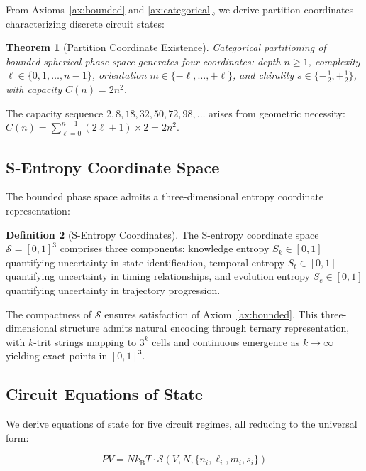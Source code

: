 \documentclass[12pt,a4paper]{article}
\theoremstyle{plain}
\newtheorem{theorem}{Theorem}[section]
\theoremstyle{definition}
\newtheorem{definition}[theorem]{Definition}
\theoremstyle{remark}
\newcommand{\kB}{k_{\mathrm{B}}}
\newcommand{\Sspace}{\mathcal{S}}
\newcommand{\Sk}{S_k}
\newcommand{\St}{S_t}
\newcommand{\Se}{S_e}
\begin{document}
From Axioms~\ref{ax:bounded} and \ref{ax:categorical}, we derive partition coordinates characterizing discrete circuit states:

\begin{theorem}[Partition Coordinate Existence]
\label{thm:partition_existence}
Categorical partitioning of bounded spherical phase space generates four coordinates: depth $n \geq 1$, complexity $\ell \in \{0,1,\ldots,n-1\}$, orientation $m \in \{-\ell,\ldots,+\ell\}$, and chirality $s \in \{-\tfrac{1}{2},+\tfrac{1}{2}\}$, with capacity $C(n) = 2n^2$.
\end{theorem}

The capacity sequence $2, 8, 18, 32, 50, 72, 98, \ldots$ arises from geometric necessity: $C(n) = \sum_{\ell=0}^{n-1} (2\ell+1) \times 2 = 2n^2$.

\subsection{S-Entropy Coordinate Space}

The bounded phase space admits a three-dimensional entropy coordinate representation:

\begin{definition}[S-Entropy Coordinates]
\label{def:s_entropy}
The S-entropy coordinate space $\Sspace = [0,1]^3$ comprises three components: knowledge entropy $\Sk \in [0,1]$ quantifying uncertainty in state identification, temporal entropy $\St \in [0,1]$ quantifying uncertainty in timing relationships, and evolution entropy $\Se \in [0,1]$ quantifying uncertainty in trajectory progression.
\end{definition}

The compactness of $\Sspace$ ensures satisfaction of Axiom~\ref{ax:bounded}. This three-dimensional structure admits natural encoding through ternary representation, with $k$-trit strings mapping to $3^k$ cells and continuous emergence as $k \to \infty$ yielding exact points in $[0,1]^3$.

\subsection{Circuit Equations of State}

We derive equations of state for five circuit regimes, all reducing to the universal form:

\begin{equation}
PV = N\kB T \cdot \mathcal{S}(V,N,\{n_i,\ell_i,m_i,s_i\})
\label{eq:universal_eos}
\end{equation}
\end{document}

